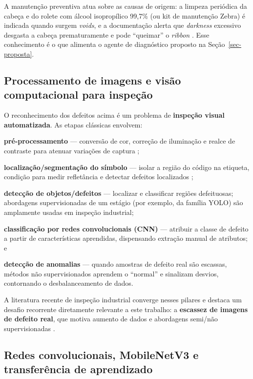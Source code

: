 \documentclass[
	article,			%
	11pt,				%
	oneside,			%
	a4paper,			%
	english,			%
	brazilian,			%
	sumario=tradicional
	]{abntex2}
\begin{document}
A manutenção preventiva atua sobre as causas de origem: a limpeza periódica da
cabeça e do rolete com álcool isopropílico 99,7\% (ou kit de manutenção Zebra) é
indicada quando surgem \textit{voids}, e a documentação alerta que
\textit{darkness} excessivo desgasta a cabeça prematuramente e pode ``queimar'' o
\textit{ribbon} \cite{zebra_printquality}. Esse conhecimento é o que alimenta o
agente de diagnóstico proposto na Seção~\ref{sec-proposta}.

\subsection{Processamento de imagens e visão computacional para inspeção}

O reconhecimento dos defeitos acima é um problema de \textbf{inspeção visual
automatizada}. As etapas clássicas envolvem:
\begin{alineas}
	\item \textbf{pré-processamento} --- conversão de cor, correção de iluminação
	e realce de contraste para atenuar variações de captura \cite{gonzalez2018};
	\item \textbf{localização/segmentação do símbolo} --- isolar a região do
	código na etiqueta, condição para medir refletância e detectar defeitos
	localizados \cite{szeliski2022};
	\item \textbf{detecção de objetos/defeitos} --- localizar e classificar
	regiões defeituosas; abordagens supervisionadas de um estágio (por exemplo, da
	família YOLO) são amplamente usadas em inspeção industrial;
	\item \textbf{classificação por redes convolucionais (CNN)} --- atribuir a
	classe de defeito a partir de características aprendidas, dispensando extração
	manual de atributos; e
	\item \textbf{detecção de anomalias} --- quando amostras de defeito real são
	escassas, métodos não supervisionados aprendem o ``normal'' e sinalizam
	desvios, contornando o desbalanceamento de dados.
\end{alineas}

A literatura recente de inspeção industrial converge nesses pilares e destaca um
desafio recorrente diretamente relevante a este trabalho: a \textbf{escassez de
imagens de defeito real}, que motiva aumento de dados e abordagens semi/não
supervisionadas \cite{frontiers2025anomaly,survey2022unsupervised}.

\subsection{Redes convolucionais, MobileNetV3 e transferência de aprendizado}
\label{sec-cnn}
\end{document}
